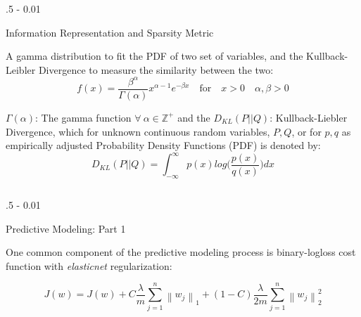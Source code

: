 \documentclass{postertheme}\usepackage[]{graphicx}\usepackage[]{color}
\begin{document}
\begin{frame}
\begin{columns}[onlytextwidth]
  \begin{column}{.5 \textwidth - 0.01 \textwidth}
    \begin{block}{Information Representation and Sparsity Metric}
    
    \footnotesize
    A gamma distribution to fit the PDF of two set of variables, and the Kullback-Leibler Divergence to measure 
    the similarity between the two:
    \begin{equation}
      f(x) = \frac{\beta^{\alpha}}{\Gamma(\alpha)} x^{\alpha - 1}e^{-\beta x} \quad \text{for}
      \quad x > 0 \quad \alpha,\beta >0 
    \end{equation}
    
    $\Gamma(\alpha)$: The gamma function $\forall \ \alpha \in \mathbb{Z}^+$ and the
    $D_{KL}(P \vert\vert Q)$: Kullback-Liebler Divergence, which for unknown continuous random variables,
    $P, Q$, or for $p, q$ as empirically adjusted Probability Density Functions (PDF) is denoted by:
    \begin{equation}
        D_{KL}(P \vert\vert Q) = \int_{-\infty}^{\infty} p(x) log \Big( \frac{p(x)}{q(x)} \Big) dx 
    \end{equation}

    \end{block}
  \end{column}
  
\end{columns}


\begin{columns}[onlytextwidth]
  
  \begin{column}{.5 \textwidth - 0.01 \textwidth}
    \begin{block}{Predictive Modeling: Part 1}
        
      One common component of the predictive modeling process is binary-logloss cost function 
      with \textit{elasticnet} regularization:

      \begin{equation}
          J(w) =  J(w) + C \frac{\lambda}{m} \sum_{j=1}^n \left \lVert w_j \right\rVert_1 + (1 - C)
          \frac{\lambda}{2m} \sum_{j=1}^n \left \lVert w_j \right\rVert_2^2
      \end{equation}


\end{block}
\end{column}
\end{columns}
\end{frame}
\end{document}
